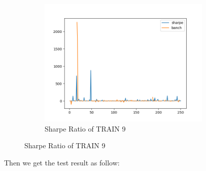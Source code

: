 \begin{figure}[H]
\begin{subfigure}{.5\textwidth}
\end{subfigure}%
\begin{subfigure}{.5\textwidth}%
\centering
\includegraphics[clip, width=0.9\textwidth]{Graphics/trainPA9S.png} \caption{Sharpe Ratio of TRAIN 9}
\end{subfigure}%
\end{figure}

\newpage
Then we get the test result as follow:

